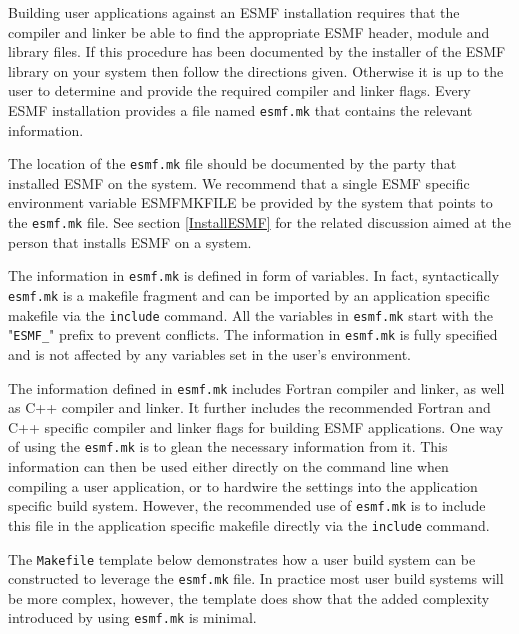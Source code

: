 
\label{UsingLibrary}

Building user applications against an ESMF installation requires that the compiler and linker be able to find the appropriate ESMF header, module and library files. If this procedure has been documented by the installer of the ESMF library on your system then follow the directions given. Otherwise it is up to the user to determine and provide the required compiler and linker flags. Every ESMF installation provides a file named {\tt esmf.mk} that contains the relevant information.

The location of the {\tt esmf.mk} file should be documented by the party that installed ESMF on the system. We recommend that a single ESMF specific environment variable ESMFMKFILE be provided by the system that points to the {\tt esmf.mk} file. See section \ref{InstallESMF} for the related discussion aimed at the person that installs ESMF on a system.

The information in {\tt esmf.mk} is defined in form of variables. In fact, syntactically {\tt esmf.mk} is a makefile fragment and can be imported by an application specific makefile via the {\tt include} command. All the variables in {\tt esmf.mk} start with the "{\tt ESMF\_}" prefix to prevent conflicts. The information in {\tt esmf.mk} is fully specified and is not affected by any variables set in the user's environment.

The information defined in {\tt esmf.mk} includes Fortran compiler and linker, as well as C++ compiler and linker. It further includes the recommended Fortran and C++ specific compiler and linker flags for building ESMF applications. One way of using the {\tt esmf.mk} is to glean the necessary information from it. This information can then be used either directly on the command line when compiling a user application, or to hardwire the settings into the application specific build system. However, the recommended use of {\tt esmf.mk} is to include this file in the application specific makefile directly via the {\tt include} command.

The {\tt Makefile} template below demonstrates how a user build system can be constructed to leverage the {\tt esmf.mk} file. In practice most user build systems will be more complex, however, the template does show that the added complexity introduced by using {\tt esmf.mk} is minimal. 

